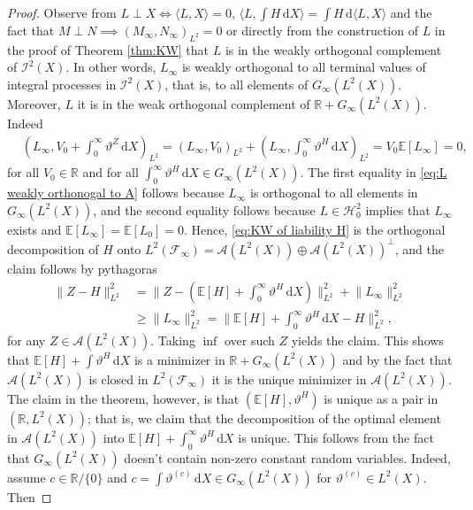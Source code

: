 \documentclass[11pt,a4paper,twoside,openany]{report}
\numberwithin{equation}{section}
\newcommand{\diff}{\mathrm{d}}
\theoremstyle{plain} %
\theoremstyle{definition} %
\theoremstyle{remark} %
\begin{document}
\begin{proof}
 
    Observe from \(L\perp X\iff\langle L,X\rangle=0\), \(\langle L,\int H\,\diff X\rangle = \int H\,\diff\langle L,X\rangle\) and the fact that \(M\perp N\implies (M_{\infty},N_{\infty})_{L^2}=0\) or directly from the construction of \(L\) in the proof of Theorem \ref{thm:KW} that \(L\) is in the weakly orthogonal complement of  \(\mathcal{I}^2(X)\). In other words, \(L_{\infty}\) is weakly orthogonal to all terminal values of integral processes in \(\mathcal{I}^2(X)\), that is, to all elements of \(G_{\infty}(L^2(X))\). Moreover, \(L\) it is in the weak orthogonal complement of \(\mathbb{R}+G_{\infty}(L^2(X))\). Indeed
\begin{align}\label{eq:L weakly orthonogal to A}
    &(L_{\infty},V_0+\int_0^{\infty} \vartheta^Z\,\diff X)_{L^2}= (L_{\infty},V_0)_{L^2}+ (L_{\infty},\int_0^{\infty} \vartheta^H\,\diff X)_{L^2}=V_0\mathbb{E}[L_{\infty}]=0,
\end{align}
for all \(V_0\in\mathbb{R}\) and for all \(\int_0^{\infty}\vartheta^H\,\diff X\in G_{\infty}(L^2(X))\). The first equality in \eqref{eq:L weakly orthonogal to A} follows because \(L_{\infty}\) is orthogonal to all elements in \(G_{\infty}(L^2(X))\), and the second equality follows because \(L\in\mathcal{H}_0^2\) implies that \(L_{\infty}\) exists and \(\mathbb{E}[L_{\infty}]=\mathbb{E}[L_0]=0\). Hence, \eqref{eq:KW of liability H} is the orthogonal decomposition of \(H\) onto \(L^2(\mathcal{F}_{\infty})=\mathcal{A}(L^2(X))\oplus \mathcal{A}(L^2(X))^{\perp}\), and the claim follows by pythagoras 
\begin{align*}
   \lVert Z-H\rVert_{L^2}^2&=
   \lVert Z -(\mathbb{E}[H]+\int_0^{\infty}\vartheta^H\,\diff X)\rVert_{L^2}^2+\lVert L_{\infty}\rVert_{L^2}^2
   \\&\geq \lVert L_{\infty}\rVert_{L^2}^2=\lVert \mathbb{E}[H]+\int_0^{\infty}\vartheta^H\,\diff X-H\rVert_{L^2}^2,
\end{align*}
for any \(Z\in\mathcal{A}(L^2(X))\). Taking \(\inf\) over such \(Z\) yields the claim. This shows that \(\mathbb{E}[H]+\int \vartheta^H\,\diff X\) is a minimizer in \(\mathbb{R}+G_{\infty}(L^2(X))\) and by the fact that \(\mathcal{A}(L^2(X))\) is closed in \(L^2(\mathcal{F}_{\infty})\) it is the unique minimizer in \(\mathcal{A}(L^2(X))\). The claim in the theorem, however, is that \((\mathbb{E}[H],\vartheta^H)\) is unique as a pair in \((\mathbb{R},L^2(X))\); that is, we claim that the decomposition of the optimal element in \(\mathcal{A}(L^2(X))\) into \(\mathbb{E}[H]+\int_0^\infty \vartheta^H\,\diff X\) is unique. This follows from the fact that \(G_{\infty}(L^2(X))\) doesn't contain non-zero constant random variables. Indeed, assume \(c\in\mathbb{R}/\{0\}\) and \(c=\int \vartheta^{(c)}\,\diff X\in G_{\infty}(L^2(X)) \) for \(\vartheta^{(c)}\in L^2(X)\). Then 

\end{proof}
\end{document}
